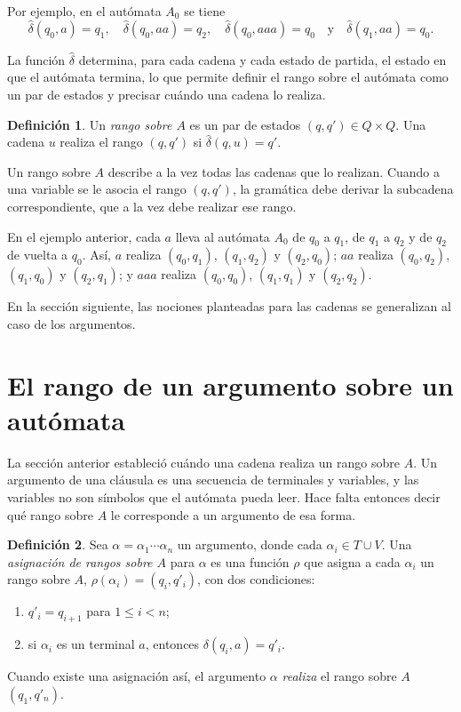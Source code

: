 \documentclass{report}
\theoremstyle{definition}
\newtheorem{definicion}{Definición}[chapter]
\theoremstyle{plain}
\theoremstyle{remark}
\begin{document}
Por ejemplo, en el autómata $A_0$ se tiene
\[
  \hat\delta(q_0, a) = q_1, \quad \hat\delta(q_0, aa) = q_2, \quad
  \hat\delta(q_0, aaa) = q_0 \quad\text{y}\quad \hat\delta(q_1, aa) = q_0.
\]

La función $\hat\delta$ determina, para cada cadena y cada estado de
partida, el estado en que el autómata termina, lo que permite definir el
rango sobre el autómata como un par de estados y precisar cuándo una
cadena lo realiza.

\begin{definicion}
Un \emph{rango sobre $A$} es un par de estados $(q, q') \in Q \times Q$.
Una cadena $u$ realiza el rango $(q, q')$ si $\hat\delta(q, u) = q'$.
\end{definicion}

Un rango sobre $A$ describe a la vez todas las cadenas que lo realizan.
Cuando a una variable se le asocia el rango $(q, q')$, la gramática debe
derivar la subcadena correspondiente, que a la vez debe realizar ese
rango.

En el ejemplo anterior, cada $a$ lleva al autómata $A_0$ de $q_0$ a
$q_1$, de $q_1$ a $q_2$ y de $q_2$ de vuelta a $q_0$. Así, $a$ realiza $(q_0, q_1)$,
$(q_1, q_2)$ y $(q_2, q_0)$; $aa$ realiza $(q_0, q_2)$, $(q_1, q_0)$ y
$(q_2, q_1)$; y $aaa$ realiza $(q_0, q_0)$, $(q_1, q_1)$ y $(q_2, q_2)$.

En la sección siguiente, las nociones planteadas para las cadenas se
generalizan al caso de los argumentos.

\section{El rango de un argumento sobre un autómata}

La sección anterior estableció cuándo una cadena realiza un rango sobre
$A$. Un argumento de una cláusula es una secuencia de terminales y
variables, y las variables no son símbolos que el autómata pueda leer.
Hace falta entonces decir qué rango sobre $A$ le corresponde a un
argumento de esa forma.

\begin{definicion}
Sea $\alpha = \alpha_1 \cdots \alpha_n$ un argumento, donde cada
$\alpha_i \in T \cup V$. Una \emph{asignación de rangos sobre $A$} para
$\alpha$ es una función $\rho$ que asigna a cada $\alpha_i$ un rango
sobre $A$, $\rho(\alpha_i) = (q_i, q'_i)$, con dos condiciones:
\begin{enumerate}
  \item $q'_i = q_{i+1}$ para $1 \le i < n$;
  \item si $\alpha_i$ es un terminal $a$, entonces $\delta(q_i, a) = q'_i$.
\end{enumerate}
Cuando existe una asignación así, el argumento $\alpha$ \emph{realiza}
el rango sobre $A$ $(q_1, q'_n)$.
\end{definicion}
\end{document}
